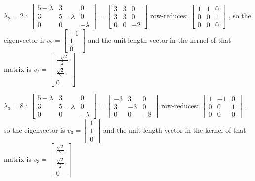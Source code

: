 \documentclass{article} %
\begin{document}
\begin{flushleft}
\begin{enumerate}
            \bigbreak
            $\lambda_{2} = 2$ :
            \bigbreak
            $\begin{bmatrix}
                5-\lambda & 3 & 0 \\ 3 & 5 - \lambda & 0 \\ 0 & 0 & -\lambda
            \end{bmatrix} = \begin{bmatrix}
                3 & 3 & 0 \\ 3 & 3 & 0 \\ 0 & 0 & -2
            \end{bmatrix}$
            \break \text row-reduces: $\begin{bmatrix}
                1 & 1 & 0 \\ 0 & 0 & 1 \\ 0 & 0 & 0
            \end{bmatrix}$ , so the eigenvector is $\mathit{v}_{2} = \begin{bmatrix}
                -1 \\ 1 \\ 0
            \end{bmatrix}$ and the unit-length vector in the kernel of that matrix is $\mathit{v}_{2} = \begin{bmatrix}
                \frac{-\sqrt{2}}{2} \\ \frac{\sqrt{2}}{2} \\ 0
            \end{bmatrix}$

            \bigbreak
            $\lambda_{3} = 8$ :
            \bigbreak
            $\begin{bmatrix}
                5-\lambda & 3 & 0 \\ 3 & 5 - \lambda & 0 \\ 0 & 0 & -\lambda
            \end{bmatrix} = \begin{bmatrix}
                -3 & 3 & 0 \\ 3 & -3 & 0 \\ 0 & 0 & -8
            \end{bmatrix}$
            \break \text row-reduces: $\begin{bmatrix}
                1 & -1 & 0 \\ 0 & 0 & 1 \\ 0 & 0 & 0
            \end{bmatrix}$ , so the eigenvector is $\mathit{v}_{3} = \begin{bmatrix}
                1 \\ 1 \\ 0
            \end{bmatrix}$ and the unit-length vector in the kernel of that matrix is $\mathit{v}_{3} = \begin{bmatrix}
                \frac{\sqrt{2}}{2} \\ \frac{\sqrt{2}}{2} \\ 0
            \end{bmatrix}$


\end{enumerate}
\end{flushleft}
\end{document}
